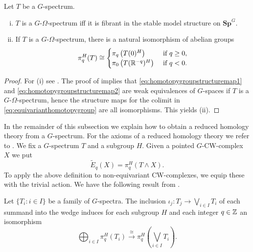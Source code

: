 \begin{lem}
Let $T$ be a $G$-spectrum.
\begin{enumerate}[(i)]
\item $T$ is a $G$-$\Omega$-spectrum iff it is fibrant
in the stable model structure on $\mathbf{Sp}^G$.
\item If $T$ is a $G$-$\Omega$-spectrum, there is a natural isomorphism
of abelian groups
\begin{equation}\label{eq:homotopygroupomegaspectrum}
\pi_q^H(T)\cong
\begin{cases}
\pi_q\left(T(0)^H\right) &\text{ if } q\ge 0,\\
\pi_0\left(T(\mathbb{R}^{-q})^H\right) &\text{ if } q<0.
\end{cases}
\end{equation}
\end{enumerate}
\end{lem}
\begin{proof}
For (i) see \cite[Proposition~III.4.12, \pno~50]{mandellmay}.
The proof of \cite[Lemma~III.3.3, \pno~45]{mandellmay} implies that
\eqref{eq:homotopygroupstructuremap1} and \eqref{eq:homotopygroupstructuremap2}
are weak equivalences of $G$-spaces if $T$ is a $G$-$\Omega$-spectrum,
hence the structure maps for the colimit in \eqref{eq:equivarianthomotopygroup}
are all isomorphisms. This yields (ii).
\end{proof}
In the remainder of this subsection we explain how to obtain a reduced homology
theory from a $G$-spectrum. For the axioms of a reduced homology
theory we refer to \cite[\pno~110]{mayconcise}. We fix a $G$-spectrum $T$
and a subgroup $H$. Given a pointed $G$-CW-complex $X$
we put
\begin{equation}\label{eq:spectrumhomology}
\tilde E_q(X) = \pi_q^H(T\wedge X).
\end{equation}
To apply the above definition to non-equivariant CW-complexes, we equip
these with the trivial action.
We have the following result from \cite[Theorem~III.3.5]{mandellmay}.
\begin{lem}\label{lem:spectrumwedge}
Let $\{T_i:i\in I\}$ be a family of $G$-spectra. The inclusion
$\iota_j:T_j\to \bigvee_{i\in I} T_i$ of each summand into the wedge
induces for each subgroup $H$ and each integer $q\in \mathbb{Z}$ an isomorphism 
\begin{equation}
\bigoplus_{i\in I} \pi_q^H(T_i)\xrightarrow{\cong} \pi_q^H\left(\bigvee_{i\in I} T_i\right).
\end{equation}
\end{lem}

